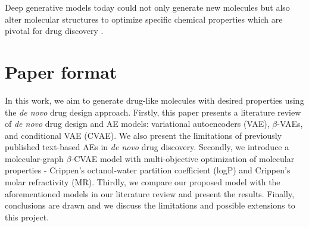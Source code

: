 Deep generative models today could not only generate new molecules but also alter molecular structures to optimize specific chemical properties which are pivotal for drug discovery \cite{bilodeau2022generative}. 

\section{Paper format}
In this work, we aim to generate drug-like molecules with desired properties using the \textit{de novo} drug design approach. Firstly, this paper presents a literature review of \textit{de novo} drug design and AE models: variational autoencoders (VAE), $\beta$-VAEs, and conditional VAE (CVAE). We also present the limitations of previously published text-based AEs in \textit{de novo} drug discovery. Secondly, we introduce a molecular-graph $\beta$-CVAE model with multi-objective optimization of molecular properties - Crippen's octanol-water partition coefficient (logP) and Crippen's molar refractivity (MR). Thirdly, we compare our proposed model with the aforementioned models in our literature review and present the results. Finally, conclusions are drawn and we discuss the limitations and possible extensions to this project.
